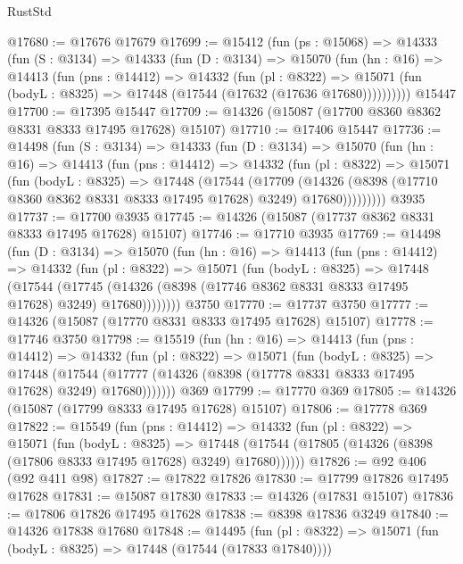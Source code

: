 \begin{lexlean}{RustStd}
\begin{coremodule}
@17680 := @17676 @17679
@17699 := @15412
    (fun (ps : @15068) =>
    @14333
      (fun (S : @3134) =>
      @14333
        (fun (D : @3134) =>
        @15070
          (fun (hn : @16) =>
          @14413
            (fun (pns : @14412) =>
            @14332
              (fun (pl : @8322) =>
              @15071 (fun (bodyL : @8325) => @17448 (@17544 (@17632 (@17636 @17680))))))))))
    @15447
@17700 := @17395 @15447
@17709 := @14326 (@15087 (@17700 @8360 @8362 @8331 @8333 @17495 @17628) @15107)
@17710 := @17406 @15447
@17736 := @14498
    (fun (S : @3134) =>
    @14333
      (fun (D : @3134) =>
      @15070
        (fun (hn : @16) =>
        @14413
          (fun (pns : @14412) =>
          @14332
            (fun (pl : @8322) =>
            @15071
              (fun (bodyL : @8325) =>
              @17448
                (@17544
                  (@17709
                    (@14326
                      (@8398 (@17710 @8360 @8362 @8331 @8333 @17495 @17628) @3249)
                      @17680)))))))))
    @3935
@17737 := @17700 @3935
@17745 := @14326 (@15087 (@17737 @8362 @8331 @8333 @17495 @17628) @15107)
@17746 := @17710 @3935
@17769 := @14498
    (fun (D : @3134) =>
    @15070
      (fun (hn : @16) =>
      @14413
        (fun (pns : @14412) =>
        @14332
          (fun (pl : @8322) =>
          @15071
            (fun (bodyL : @8325) =>
            @17448
              (@17544
                (@17745
                  (@14326 (@8398 (@17746 @8362 @8331 @8333 @17495 @17628) @3249) @17680))))))))
    @3750
@17770 := @17737 @3750
@17777 := @14326 (@15087 (@17770 @8331 @8333 @17495 @17628) @15107)
@17778 := @17746 @3750
@17798 := @15519
    (fun (hn : @16) =>
    @14413
      (fun (pns : @14412) =>
      @14332
        (fun (pl : @8322) =>
        @15071
          (fun (bodyL : @8325) =>
          @17448
            (@17544 (@17777 (@14326 (@8398 (@17778 @8331 @8333 @17495 @17628) @3249) @17680)))))))
    @369
@17799 := @17770 @369
@17805 := @14326 (@15087 (@17799 @8333 @17495 @17628) @15107)
@17806 := @17778 @369
@17822 := @15549
    (fun (pns : @14412) =>
    @14332
      (fun (pl : @8322) =>
      @15071
        (fun (bodyL : @8325) =>
        @17448 (@17544 (@17805 (@14326 (@8398 (@17806 @8333 @17495 @17628) @3249) @17680))))))
@17826 := @92 @406 (@92 @411 @98)
@17827 := @17822 @17826
@17830 := @17799 @17826 @17495 @17628
@17831 := @15087 @17830
@17833 := @14326 (@17831 @15107)
@17836 := @17806 @17826 @17495 @17628
@17838 := @8398 @17836 @3249
@17840 := @14326 @17838 @17680
@17848 := @14495
    (fun (pl : @8322) => @15071 (fun (bodyL : @8325) => @17448 (@17544 (@17833 @17840))))

\end{coremodule}
\end{lexlean}
